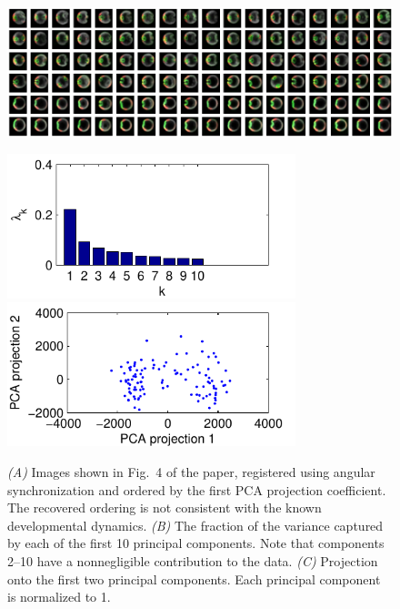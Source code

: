 \documentclass{pnastwo}
\newcommand{\fig}[0]{Fig.}
\begin{document}
\begin{figure}
\includegraphics[width=16.8cm]{data2_PCA_ordered}

\includegraphics[width=8.4cm]{data2_PCA_variance}
\includegraphics[width=8.4cm]{data2_PCA_proj}

\caption{{\it (A)} Images shown in \fig~4 of the paper, registered using angular synchronization \cite{singer2011angular} and ordered by the first PCA projection coefficient. The recovered ordering is not consistent with the known developmental dynamics. {\it (B)} The fraction of the variance captured by each of the first 10 principal components. Note that components 2--10 have a nonnegligible contribution to the data. {\it (C)} Projection onto the first two principal components. Each principal component is normalized to 1. }
\label{fig:PCA_results}
\end{figure}
\end{document}
